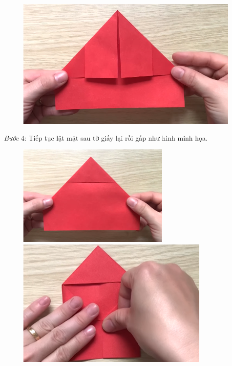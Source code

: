 \begin{multicols}{2}
\begin{figure}[H]
		\vspace*{1pt}
		\includegraphics[width=1\linewidth]{25}
		\vspace*{-15pt}
	\end{figure}
	\textit{Bước} $4$: Tiếp tục lật mặt sau tờ giấy lại rồi gấp như hình minh họa. 
	\begin{figure}[H]
		\vspace*{-5pt}
		\centering
		\captionsetup{labelformat= empty, justification=centering}
		\includegraphics[height= 0.327\linewidth]{26}
		\includegraphics[height= 0.327\linewidth]{27}
		

\end{figure}
\end{multicols}
